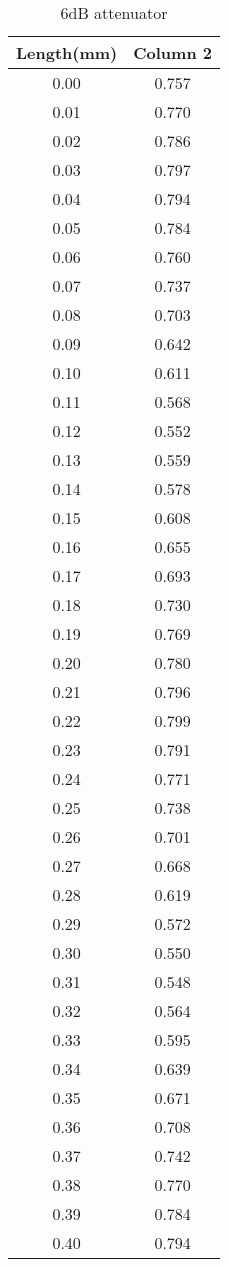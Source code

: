 \documentclass{report}
\begin{document}
    \begin{table}[H]
        \centering
        \begin{tabular}{cc}
        \hline
        Length(mm) & Column 2 \\
        \hline
        0.00 & 0.757 \\
        0.01 & 0.770 \\
        0.02 & 0.786 \\
        0.03 & 0.797 \\
        0.04 & 0.794 \\
        0.05 & 0.784 \\
        0.06 & 0.760 \\
        0.07 & 0.737 \\
        0.08 & 0.703 \\
        0.09 & 0.642 \\
        0.10 & 0.611 \\
        0.11 & 0.568 \\
        0.12 & 0.552 \\
        0.13 & 0.559 \\
        0.14 & 0.578 \\
        0.15 & 0.608 \\
        0.16 & 0.655 \\
        0.17 & 0.693 \\
        0.18 & 0.730 \\
        0.19 & 0.769 \\
        0.20 & 0.780 \\
        0.21 & 0.796 \\
        0.22 & 0.799 \\
        0.23 & 0.791 \\
        0.24 & 0.771 \\
        0.25 & 0.738 \\
        0.26 & 0.701 \\
        0.27 & 0.668 \\
        0.28 & 0.619 \\
        0.29 & 0.572 \\
        0.30 & 0.550 \\
        0.31 & 0.548 \\
        0.32 & 0.564 \\
        0.33 & 0.595 \\
        0.34 & 0.639 \\
        0.35 & 0.671 \\
        0.36 & 0.708 \\
        0.37 & 0.742 \\
        0.38 & 0.770 \\
        0.39 & 0.784 \\
        0.40 & 0.794 \\
        \hline
        \end{tabular}
        \caption{6dB attenuator}
    \end{table}
\end{document}
